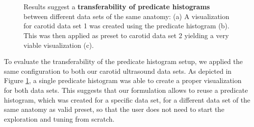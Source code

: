 \begin{figure}[ht]
	\centering
	 \\%
	 \\%
	\caption{
		Results suggest a \textbf{transferability of predicate histograms} between different data sets of the same anatomy: 
		(a) A visualization for carotid data set 1 was created using the predicate histogram (b).
		This was then applied as preset to carotid data set 2 yielding a very viable visualization (c).
	}
	\label{fig:predicates:histogram-transferability}
\end{figure}

To evaluate the transferability of the predicate histogram setup, we applied the same configuration to both our carotid ultrasound data sets. 
As depicted in Figure \ref{fig:predicates:histogram-transferability}, a single predicate histogram was able to create a proper visualization for both data sets. 
This suggests that our formulation allows to reuse a predicate histogram, which was created for a specific data set, for a different data set of the same anatomy as valid preset, so that the user does not need to start the exploration and tuning from scratch.

